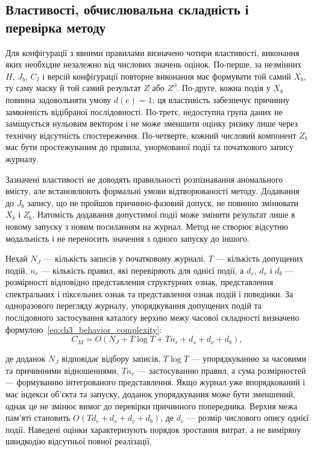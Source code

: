 \subsection{Властивості, обчислювальна складність і перевірка методу}

Для конфігурації з явними правилами визначено чотири властивості, виконання яких необхідне незалежно від числових значень оцінок. По-перше, за незмінних $H$, $J_b$, $C_I$ і версій конфігурації повторне виконання має формувати той самий $X_b$, ту саму маску й той самий результат $Z$ або $Z^{\partial}$. По-друге, кожна подія у $X_b$ повинна задовольняти умову $d(e)=1$; ця властивість забезпечує причинну замкненість відібраної послідовності. По-третє, недоступна група даних не заміщується нульовим вектором і не може зменшити оцінку ризику лише через технічну відсутність спостереження. По-четверте, кожний числовий компонент $Z_b$ має бути простежуваним до правила, унормованої події та початкового запису журналу.

Зазначені властивості не доводять правильності розпізнавання аномального вмісту, але встановлюють формальні умови відтворюваності методу. Додавання до $J_b$ запису, що не пройшов причинно-фазовий допуск, не повинно змінювати $X_b$ і $Z_b$. Натомість додавання допустимої події може змінити результат лише в новому запуску з новим посиланням на журнал. Метод не створює відсутню модальність і не переносить значення з одного запуску до іншого.

Нехай $N_J$ --- кількість записів у початковому журналі, $T$ --- кількість допущених подій, $n_r$ --- кількість правил, які перевіряють для однієї події, а $d_s$, $d_v$ і $d_b$ --- розмірності відповідно представлення структурних ознак, представлення спектральних і піксельних ознак та представлення ознак подій і поведінки. За одноразового перегляду журналу, упорядкування допущених подій та послідовного застосування каталогу верхню межу часової складності визначено формулою~\eqref{eq:ch3_behavior_complexity}:
\begin{equation}
C_M=O\!\left(N_J+T\log T+Tn_r+d_s+d_v+d_b\right),
\label{eq:ch3_behavior_complexity}
\end{equation}

де доданок $N_J$ відповідає відбору записів, $T\log T$ --- упорядкуванню за часовими та причинними відношеннями, $Tn_r$ --- застосуванню правил, а сума розмірностей --- формуванню інтегрованого представлення. Якщо журнал уже впорядкований і має індекси об’єкта та запуску, доданок упорядкування може бути зменшений, однак це не змінює вимог до перевірки причинного попередника. Верхня межа пам’яті становить $O(Td_e+d_s+d_v+d_b)$, де $d_e$ --- розмір числового опису однієї події. Наведені оцінки характеризують порядок зростання витрат, а не виміряну швидкодію відсутньої повної реалізації.

